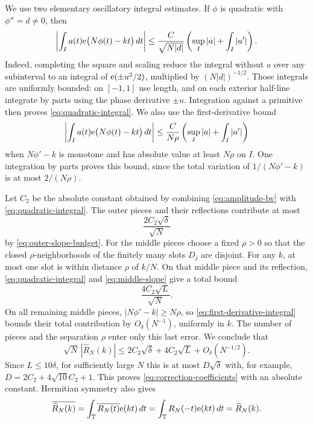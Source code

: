 We use two elementary oscillatory integral estimates.  If $\phi$ is
quadratic with $\phi''=d\ne0$, then
\begin{equation}\label{eq:quadratic-integral}
 \left|\int_I a(t)\mathrm e\bigl(N\phi(t)-kt\bigr)\,dt\right|
 \le \frac{C}{\sqrt{N|d|}}
       \left(\sup_I|a|+\int_I|a'|\right).
\end{equation}
Indeed, completing the square and scaling reduce the integral without
$a$ over any subinterval to an integral of $\mathrm e(\pm u^2/2)$, multiplied
by $(N|d|)^{-1/2}$.  Those integrals are uniformly bounded: on $[-1,1]$
use length, and on each exterior half-line integrate by parts using the
phase derivative $\pm u$.  Integration against a primitive then proves
\eqref{eq:quadratic-integral}.  We also use the first-derivative bound
\begin{equation}\label{eq:first-derivative-integral}
 \left|\int_I a(t)\mathrm e\bigl(N\phi(t)-kt\bigr)\,dt\right|
 \le \frac{C}{N\rho}
       \left(\sup_I|a|+\int_I|a'|\right)
\end{equation}
when $N\phi'-k$ is monotone and has absolute value at least $N\rho$ on
$I$.  One integration by parts proves this bound, since the total
variation of $1/(N\phi'-k)$ is at most $2/(N\rho)$.

Let $C_2$ be the absolute constant obtained by combining
\eqref{eq:amplitude-bv} with \eqref{eq:quadratic-integral}.
The outer pieces and their reflections contribute at most
\[
 \frac{2C_2\sqrt\delta}{\sqrt N}
\]
by \eqref{eq:outer-slope-budget}.  For the middle pieces choose a fixed
$\rho>0$ so that the closed $\rho$-neighborhoods of the finitely many
slots $D_j$ are disjoint.  For any $k$, at most one slot is within
distance $\rho$ of $k/N$.  On that middle piece and its reflection,
\eqref{eq:quadratic-integral} and \eqref{eq:middle-slope} give a total
bound
\[
 \frac{4C_2\sqrt L}{\sqrt N}.
\]
On all remaining middle pieces, $|N\phi'-k|\ge N\rho$, so
\eqref{eq:first-derivative-integral} bounds their total contribution
by $O_\delta(N^{-1})$, uniformly in $k$.  The number of pieces and the
separation $\rho$ enter only this last error.  We conclude that
\[
 \sqrt N\,|\widehat R_N(k)|
 \le 2C_2\sqrt\delta+4C_2\sqrt L+O_\delta(N^{-1/2}).
\]
Since $L\le10\delta$, for sufficiently large $N$ this is at most
$D\sqrt\delta$ with, for example,
$D=2C_2+4\sqrt{10}C_2+1$.  This proves
\eqref{eq:correction-coefficients} with an absolute constant.
Hermitian symmetry also gives
\[
 \overline{\widehat R_N(k)}
 =\int_\mathbb T\overline{R_N(t)}\mathrm e(kt)\,dt
 =\int_\mathbb T R_N(-t)\mathrm e(kt)\,dt
 =\widehat R_N(k).
\]

